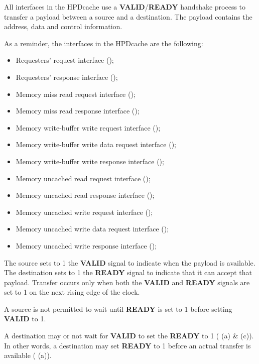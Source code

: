 \documentclass[10pt,titlepage,twoside]{book}
\begin{document}
All interfaces in the \ac{HPDcache} use a \textbf{VALID}/\textbf{READY} handshake process to transfer a payload between a source and a destination.
The payload contains the address, data and control information.

As a reminder, the interfaces in the \ac{HPDcache} are the following:
\begin{itemize}
  \item Requesters' request interface ();
  \item Requesters' response interface ();
  \item Memory miss read request interface ();
  \item Memory miss read response interface ();
  \item Memory write-buffer write request interface ();
  \item Memory write-buffer write data request interface ();
  \item Memory write-buffer write response interface ();
  \item Memory uncached read request interface ();
  \item Memory uncached read response interface ();
  \item Memory uncached write request interface ();
  \item Memory uncached write data request interface ();
  \item Memory uncached write response interface ();
\end{itemize}

The source sets to 1 the \textbf{VALID} signal to indicate when the payload is available.
The destination sets to 1 the \textbf{READY} signal to indicate that it can accept that payload.
Transfer occurs only when both the \textbf{VALID} and \textbf{READY} signals are set to 1 on the next rising edge of the clock.

A source is not permitted to wait until \textbf{READY} is set to 1 before setting \textbf{VALID} to 1.

A destination may or not wait for \textbf{VALID} to set the \textbf{READY} to 1 ( (a) \& (c)). In other words, a destination may set \textbf{READY} to 1 before an actual transfer is available ( (a)).
\end{document}
